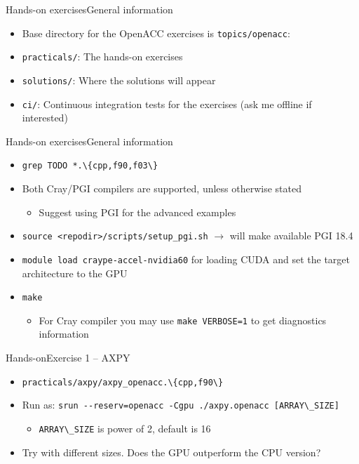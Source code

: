 \documentclass[12pt,aspectratio=169]{beamer}
\newcommand\shinline[2][]{\lstinline[style=shstyle,basicstyle=\ttfamily,#1]!#2!}
\begin{document}
\begin{frame}[fragile]{Hands-on exercises}{General information}
  \begin{itemize}
  \item Base directory for the OpenACC exercises is \shinline{topics/openacc}:
  \item \texttt{practicals/}: The hands-on exercises
  \item \texttt{solutions/}: Where the solutions will appear
  \item \texttt{ci/}: Continuous integration tests for the exercises (ask me offline if interested)
  \end{itemize}
\end{frame}

\begin{frame}[fragile]{Hands-on exercises}{General information}
  \begin{itemize}
  \item \shinline{grep TODO *.\{cpp,f90,f03\}}
  \item Both Cray/PGI compilers are supported, unless otherwise stated
    \begin{itemize}
    \item Suggest using PGI for the advanced examples
    \end{itemize}
  \item \shinline{source <repodir>/scripts/setup_pgi.sh} $\rightarrow$ will make available PGI 18.4
  \item \shinline{module load craype-accel-nvidia60} for loading CUDA and set the target architecture to the GPU
  \item \shinline{make}
    \begin{itemize}
    \item For Cray compiler you may use \shinline{make VERBOSE=1} to get diagnostics information
    \end{itemize}
  \end{itemize}
\end{frame}

\begin{frame}{Hands-on}{Exercise 1 -- AXPY}
  \begin{itemize}
  \item \shinline{practicals/axpy/axpy_openacc.\{cpp,f90\}}
  \item Run as: \shinline{srun --reserv=openacc -Cgpu ./axpy.openacc [ARRAY\_SIZE]}
    \begin{itemize}
    \item \shinline{ARRAY\_SIZE} is power of 2, default is 16
    \end{itemize}
  \item Try with different sizes. Does the GPU outperform the CPU version?
  \end{itemize}
\end{frame}
\end{document}
